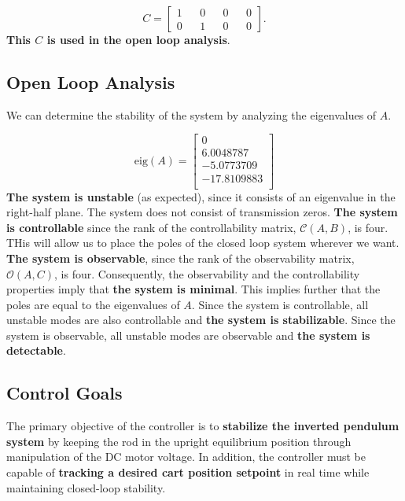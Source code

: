 \documentclass[a4paper,10pt]{article}
\theoremstyle{bluehomework}
\numberwithin{equation}{section}
\begin{document}
\begin{equation}
  C = 
  \begin{bmatrix}
    1 && 0 && 0 && 0 \\
    0 && 1 && 0 && 0
  \end{bmatrix}.
\end{equation}
\textbf{This $C$ is used in the open loop analysis}.

\subsection{Open Loop Analysis}

We can determine the stability of the system by analyzing the eigenvalues of $A$. 

\begin{equation}
  \text{eig}(A) = 
  \begin{bmatrix}
    0 \\
    6.0048787 \\
    -5.0773709 \\
    -17.8109883 \\
  \end{bmatrix}
\end{equation}
\textbf{The system is unstable} (as expected), since it consists of an eigenvalue in the right-half plane. The system does not consist of transmission zeros. \textbf{The system is controllable} since the rank of the controllability matrix, $\mathcal{C}(A,B)$, is four. THis will allow us to place the poles of the closed loop system wherever we want. \textbf{The system is observable}, since the rank of the observability matrix, $\mathcal{O}(A, C)$, is four. Consequently, the observability and the controllability properties imply that \textbf{the system is minimal}. This implies further that the poles are equal to the eigenvalues of $A$. Since the system is controllable, all unstable modes are also controllable and \textbf{the system is stabilizable}. Since the system is observable, all unstable modes are observable and \textbf{the system is detectable}.

\subsection{Control Goals}

The primary objective of the controller is to \textbf{stabilize the inverted pendulum system} by keeping the rod in the upright equilibrium position through manipulation of the DC motor voltage. In addition, the controller must be capable of \textbf{tracking a desired cart position setpoint} in real time while maintaining closed-loop stability. 
\medskip
\end{document}
